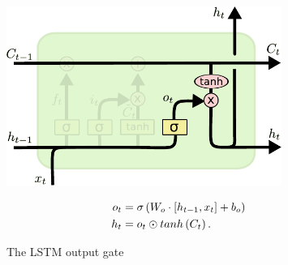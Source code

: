 \begin{figure}[p]
\begin{minipage}{0.5\textwidth}
    \centering
    \includegraphics[width=0.8\textwidth]{pdf/LSTM_output_gate.pdf}
    \caption{The LSTM output gate\label{fig:LSTM_output_gate}}
\end{minipage}
\begin{minipage}{0.5\textwidth}
    \setlength\abovedisplayshortskip{0pt}
    \setlength\belowdisplayshortskip{0pt}
    \strut
    \begin{equation}\label{eq:LSTM_output_gate}
    \begin{split}
        o_t &= \sigma\left(W_o \cdot \left[h_{t-1}, x_t\right] + b_o \right)\\
        h_t &= o_t \odot tanh \left(C_t\right).
    \end{split}
    \end{equation}
    \strut
\end{minipage}
\end{figure}

